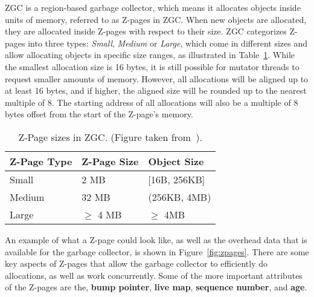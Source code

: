 ZGC is a region-based garbage collector, which means it allocates objects inside units of memory, referred to as Z-pages in ZGC. When new objects are allocated, they are allocated inside Z-pages with respect to their size. ZGC categorizes Z-pages into three types: \textit{Small}, \textit{Medium} or \textit{Large}, which come in different sizes and allow allocating objects in specific size ranges, as illustrated in Table~\ref{table:zpage_sizes}. While the smallest allocation size is 16 bytes, it is still possible for mutator threads to request smaller amounts of memory. However, all allocations will be aligned up to at least 16 bytes, and if higher, the aligned size will be rounded up to the nearest multiple of 8. The starting address of all allocations will also be a multiple of 8 bytes offset from the start of the Z-page's memory.

\begin{table}[H]
    \centering
    \begin{tabular}{lllll}
        \hline
        Z-Page Type & Z-Page Size          & \multicolumn{3}{l}{Object Size}        \\ \hline
        Small     & 2 MB                & \multicolumn{3}{l}{{[}16B, 256KB{]}}   \\
        Medium    & 32 MB               & \multicolumn{3}{l}{(256KB, 4MB)}       \\
        Large     & $\geq$ 4 MB & \multicolumn{3}{l}{$\geq$ 4MB} \\ \hline
    \end{tabular}
    \caption{Z-Page sizes in ZGC. (Figure taken from~\cite{zpage_size_table}). }
    \label{table:zpage_sizes}
\end{table}

An example of what a Z-page could look like, as well as the overhead data that is available for the garbage collector, is shown in Figure~\ref{fig:zpages}. There are some key aspects of Z-pages that allow the garbage collector to efficiently do allocations, as well as work concurrently. Some of the more important attributes of the Z-pages are the, \textbf{bump pointer}, \textbf{live map}, \textbf{sequence number}, and \textbf{age}.

